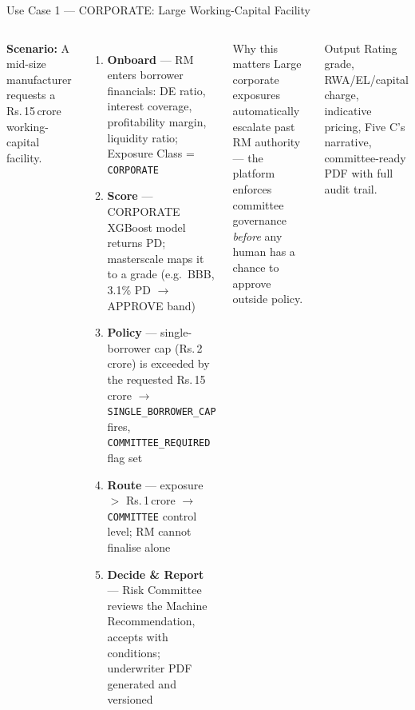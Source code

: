 \documentclass[9pt,aspectratio=169]{beamer}
\begin{document}
\begin{frame}{Use Case 1 --- CORPORATE: Large Working-Capital Facility}
\vspace{-2pt}
\begin{columns}[T]
    \footnotesize
    \textbf{Scenario:} A mid-size manufacturer requests a Rs.\,15\,crore working-capital facility.
    \begin{enumerate}\setlength\itemsep{4pt}
      \item[\textbf{1.}] \textbf{Onboard} --- RM enters borrower financials: DE ratio, interest
            coverage, profitability margin, liquidity ratio; Exposure Class = \texttt{CORPORATE}
      \item[\textbf{2.}] \textbf{Score} --- CORPORATE XGBoost model returns PD; masterscale maps
            it to a grade (e.g.\ BBB, 3.1\% PD $\to$ APPROVE band)
      \item[\textbf{3.}] \textbf{Policy} --- single-borrower cap (Rs.\,2\,crore) is exceeded by the
            requested Rs.\,15\,crore $\to$ \texttt{SINGLE\_BORROWER\_CAP} fires, \texttt{COMMITTEE\_REQUIRED} flag set
      \item[\textbf{4.}] \textbf{Route} --- exposure $>$ Rs.\,1\,crore $\to$ \texttt{COMMITTEE} control level;
            RM cannot finalise alone
      \item[\textbf{5.}] \textbf{Decide \& Report} --- Risk Committee reviews the Machine
            Recommendation, accepts with conditions; underwriter PDF generated and versioned
    \end{enumerate}
    \begin{block}{Why this matters}
      \footnotesize
      Large corporate exposures automatically escalate past RM authority --- the platform
      enforces committee governance \emph{before} any human has a chance to approve outside policy.
    \end{block}
    \vspace{5pt}
    \begin{block}{Output}
      \footnotesize
      Rating grade, RWA/EL/capital charge, indicative pricing, Five C's narrative, committee-ready
      PDF with full audit trail.
    \end{block}
\end{columns}
\end{frame}
\end{document}
